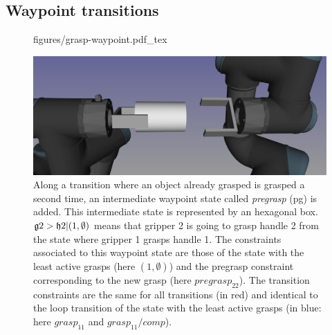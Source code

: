 \subsection{Waypoint transitions}\label{subsec:waypoint}

\begin{figure}
  \begin{center}
    \def\svgwidth {\linewidth}
    {
      \graphicspath{{./figures/}}
       {figures/grasp-waypoint.pdf_tex}
    }
    \includegraphics[width=.8\linewidth]{figures/dual-grasp-pregrasp.png}
  \end{center}
  \caption{Along a transition where an object already grasped is grasped a second time, an intermediate waypoint state called
    \textit{pregrasp} (pg) is added. This intermediate state is represented by
    an hexagonal box. $\mathfrak{g}{2} > \mathfrak{h}{2}|(1,\emptyset)$ means that
    gripper 2 is going to grasp handle 2 from the state where gripper 1 grasps
    handle 1. The constraints associated to this waypoint state are those
    of the state with the least active grasps (here $(1,\emptyset)$)
    and the pregrasp constraint corresponding to the new grasp (here $pregrasp_{22}$). The transition
    constraints are the same for all transitions (in red) and identical to
    the loop transition of the state with the least active grasps (in blue: here
    $grasp_{11}$ and $grasp_{11}/comp$).}
  \label{fig:pregrasp-grasp}
\end{figure}
